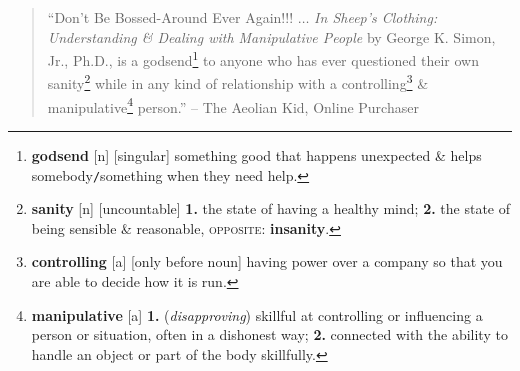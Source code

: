 \documentclass[oneside]{book}
\numberwithin{equation}{section}
\begin{document}
\begin{quotation}
	``Don't Be Bossed-Around Ever Again!!! $\ldots$ \textit{In Sheep's Clothing: Understanding \& Dealing with Manipulative People} by George K. Simon, Jr., Ph.D., is a godsend\footnote{\textbf{godsend} [n] [singular] something good that happens unexpected \& helps somebody\texttt{/}something when they need help.} to anyone who has ever questioned their own sanity\footnote{\textbf{sanity} [n] [uncountable] \textbf{1.} the state of having a healthy mind; \textbf{2.} the state of being sensible \& reasonable, \textsc{opposite}: \textbf{insanity}.} while in any kind of relationship with a controlling\footnote{\textbf{controlling} [a] [only before noun] having power over a company so that you are able to decide how it is run.} \& manipulative\footnote{\textbf{manipulative} [a] \textbf{1.} (\textit{disapproving}) skillful at controlling or influencing a person or situation, often in a dishonest way; \textbf{2.} connected with the ability to handle an object or part of the body skillfully.} person.'' -- The Aeolian Kid, Online Purchaser\\
	

\end{quotation}
\end{document}
